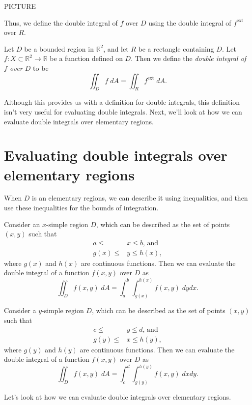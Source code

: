 \documentclass{ximera}
\begin{document}
PICTURE

Thus, we define the double integral of $f$ over $D$ using the double integral of $f^{\text{ext}}$ over $R$.

\begin{definition}
Let $D$ be a bounded region in $\mathbb{R}^2$, and let $R$ be a rectangle containing $D$. Let $f:X\subset\mathbb{R}^2\rightarrow\mathbb{R}$ be a function defined on $D$. Then we define the \emph{double integral of $f$ over $D$} to be
\[
\iint_D f\;dA = \iint_R f^{\text{ext}}\;dA.
\]
\end{definition}

Although this provides us with a definition for double integrals, this definition isn't very useful for evaluating double integrals. Next, we'll look at how we can evaluate double integrals over elementary regions.

\section*{Evaluating double integrals over elementary regions}

When $D$ is an elementary regions, we can describe it using inequalities, and then use these inequalities for the bounds of integration.

\begin{proposition}
Consider an $x$-simple region $D$, which can be described as the set of points $(x,y)$ such that
\begin{align*}
a\leq &x\leq b\text{, and}\\
g(x)\leq &y \leq h(x),
\end{align*}
where $g(x)$ and $h(x)$ are continuous functions. Then we can evaluate the double integral of a function $f(x,y)$ over $D$ as
\[
\iint_D f(x,y)\;dA = \int_a^b\int_{g(x)}^{h(x)} f(x,y)\;dydx.
\]

Consider a $y$-simple region $D$, which can be described as the set of points $(x,y)$ such that
\begin{align*}
c\leq & y\leq d\text{, and}\\
g(y)\leq & x \leq h(y),
\end{align*}
where $g(y)$ and $h(y)$ are continuous functions. Then we can evaluate the double integral of a function $f(x,y)$ over $D$ as
\[
\iint_D f(x,y)\;dA = \int_c^d\int_{g(y)}^{h(y)} f(x,y)\;dxdy.
\]
\end{proposition}

Let's look at how we can evaluate double integrals over elementary regions.
\end{document}
